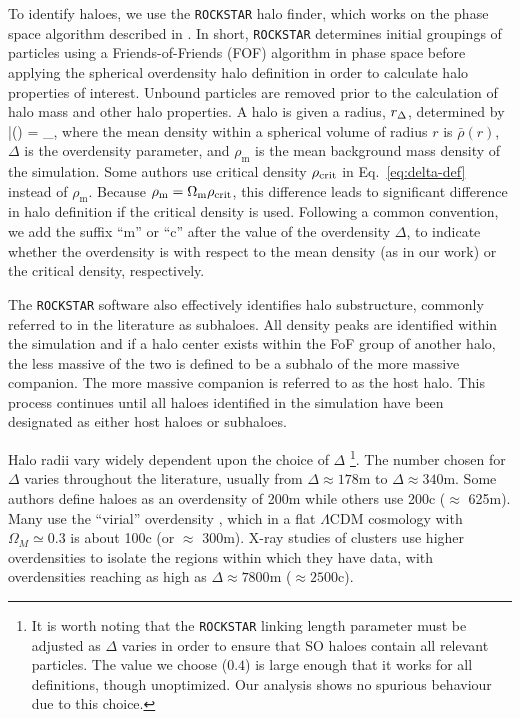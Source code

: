 \documentclass[usenatbib,fleqn]{mnras}
\begin{document}
To identify haloes, we use the {\tt ROCKSTAR} halo finder, which works on the phase space algorithm described in \citet{behroozi_etal13a}. In short, {\tt ROCKSTAR} determines initial groupings of particles using a Friends-of-Friends (FOF) algorithm in phase space before applying the spherical overdensity halo definition in order to calculate halo properties of interest. Unbound particles are removed prior to the calculation of halo mass and other halo properties. A halo is given a radius, $r_{\Delta}$, determined by
\beq
\label{eq:delta-def}
	\bar{\rho}(\Rdel) = \Delta \rho_{}, 
\eeq
where the mean density within a spherical volume of radius $r$ is $\bar{\rho}(r)$, $\Delta$ is the overdensity parameter, and $\rho_{\mathrm{m}}$ is the mean background mass density of the simulation. 
Some authors use critical density  $\rho_{\rm crit}$ in Eq.~\eqref{eq:delta-def} instead of $\rho_{\mathrm{m}}$. Because $\rho_{\mathrm{m}} = \Omega_{\rm m}\rho_{\rm crit}$, this difference leads to significant difference in halo definition if the critical density is used. Following a common convention, we add the suffix ``m'' or ``c'' after the value of the overdensity $\Delta$, to indicate whether the overdensity is with respect to the mean density (as in our work) or the critical density, respectively.

The {\tt ROCKSTAR} software also effectively identifies halo substructure, commonly referred to in the literature as subhaloes. All density peaks are identified within the simulation and if a halo center exists within the FoF group of another halo, the less massive of the two is defined to be a subhalo of the more massive companion. The more massive companion is referred to as the host halo. This process continues until all haloes identified in the simulation have been designated as either host haloes or subhaloes.

Halo radii vary widely dependent upon the choice of $\Delta$%
\footnote{It is worth noting that the {\tt ROCKSTAR} linking length parameter must be adjusted as $\Delta$ varies in order to ensure that SO haloes contain all relevant particles. The value we choose ($0.4$) is large enough that it works for all definitions, though unoptimized. Our analysis shows no spurious behaviour due to this choice.}. The number chosen for $\Delta$ varies throughout the literature, usually from $\Delta \approx 178$m to $\Delta \approx 340$m. Some authors define haloes as an overdensity of 200m while others use 200c ($\approx$ 625m). Many use the ``virial'' overdensity \citep{Bryan1998}, which in a flat $\Lambda$CDM cosmology with $\Omega_M \simeq 0.3$ is about 100c (or $\approx$ 300m). X-ray studies of clusters use higher overdensities to isolate the regions within which they have data, with overdensities reaching as high as $\Delta \approx 7800$m ($\approx 2500$c).
\end{document}
